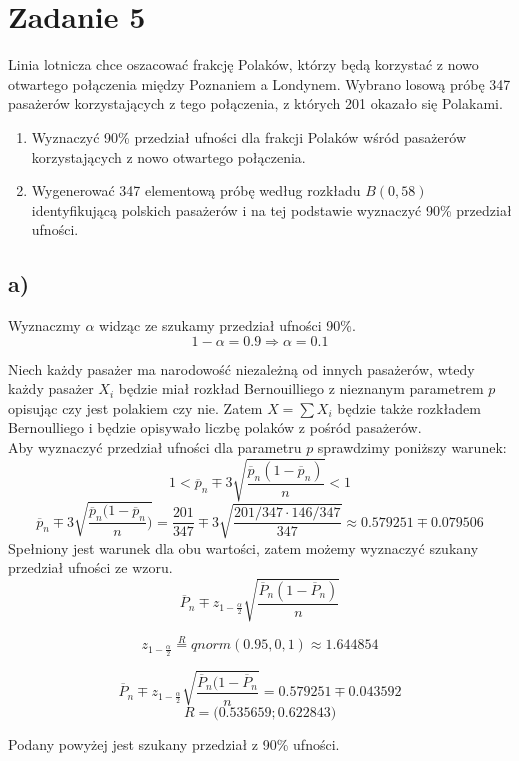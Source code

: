 \documentclass{article}
\begin{document}
\newpage
\section{Zadanie 5}
Linia lotnicza chce oszacować frakcję Polaków, którzy będą korzystać z nowo otwartego połączenia między Poznaniem a Londynem. Wybrano losową próbę 347 pasażerów korzystających z tego połączenia, z których 201 okazało się Polakami.
\begin{enumerate}[label = \alph*)]
\item Wyznaczyć 90\% przedział ufności dla frakcji Polaków wśród pasażerów korzystających z nowo otwartego połączenia.
\item Wygenerować 347 elementową próbę według rozkładu $B(0,58)$ identyfikującą polskich pasażerów i na tej podstawie wyznaczyć 90\% przedział ufności.
\end{enumerate}

\subsection{a)}
Wyznaczmy $\alpha$ widząc ze szukamy przedział ufności 90\%.
\[ 1 - \alpha = 0.9 \Rightarrow \alpha = 0.1 \]

Niech każdy pasażer ma narodowość niezależną od innych pasażerów, wtedy każdy pasażer $X_i$ będzie miał rozkład Bernouilliego z nieznanym parametrem $p$ opisując czy jest polakiem czy nie. Zatem $X = \sum X_i$ będzie także rozkładem Bernoulliego i będzie opisywało liczbę polaków z pośród pasażerów. \\
Aby wyznaczyć przedział ufności dla parametru $p$ sprawdzimy poniższy warunek:
\[ 1 < \overline{p}_n \mp 3\sqrt{\frac{\overline{p}_n(1-\overline{p}_n) }{n}} < 1 \]
\[ \overline{p}_n \mp 3\sqrt{\frac{\overline{p}_n(1-\overline{p}_n}{n}) } = \frac{201}{347} \mp 3\sqrt{\frac{201/347\cdot 146/347}{347}} \approx 0.579251 \mp 0.079506 \]
Spełniony jest warunek dla obu wartości, zatem możemy wyznaczyć szukany przedział ufności ze wzoru.
\[ \overline{P}_n \mp z_{1-\frac{\alpha}{2}} \sqrt{\frac{\overline{P}_n(1-\overline{P}_n) }{n}} \]

\[ z_{1-\frac{\alpha}{2}} \overset{R}{=} qnorm(0.95, 0, 1) \approx 1.644854 \]

\[ \overline{P}_n \mp z_{1-\frac{\alpha}{2}} \sqrt{\frac{\overline{P}_n(1-\overline{P}_n}{n}} = 0.579251 \mp 0.043592\]
\[R = \Big( 0.535659 ; 0.622843 \Big) \]

Podany powyżej jest szukany przedział z 90\% ufności.
\end{document}
